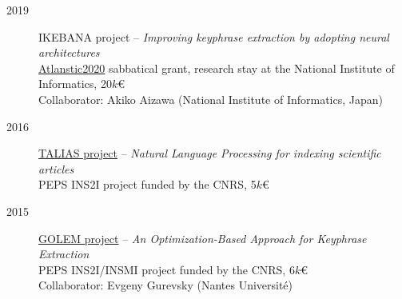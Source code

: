 \begin{description}
    
    \item[2019] IKEBANA project -- 
                \emph{Improving keyphrase extraction by adopting neural architectures} \\
                \href{https://Atlanstic2020.fr/}{Atlanstic2020} sabbatical grant, research stay at the National Institute of Informatics, 20$k$€ \\
                Collaborator: Akiko Aizawa (National Institute of Informatics, Japan)

    \item[2016] \href{http://boudinfl.github.io/talias/}{TALIAS project} -- 
                \emph{Natural Language Processing for indexing scientific articles} \\
                PEPS INS2I project funded by the CNRS, 5$k$€

    \item[2015] \href{http://boudinfl.github.io/golem/}{GOLEM project} -- 
                \emph{An Optimization-Based Approach for Keyphrase Extraction} \\
                PEPS INS2I/INSMI project funded by the CNRS, 6$k$€ \\
                Collaborator: Evgeny Gurevsky (Nantes Université)
                
\end{description}
